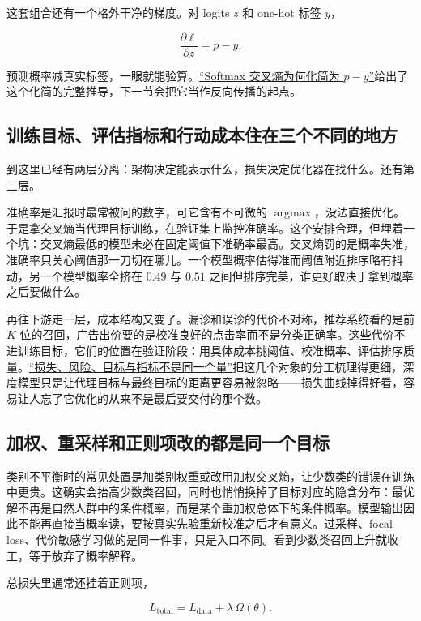 这套组合还有一个格外干净的梯度。对 logits \(z\) 和 one-hot 标签 \(y\)，

\[
\frac{\partial\ell}{\partial z}=p-y .
\]

预测概率减真实标签，一眼就能验算。\hyperref[sec:10-Matrix-Calculus/04-Applications/02]{``Softmax 交叉熵为何化简为 \(p-y\)''}给出了这个化简的完整推导，下一节会把它当作反向传播的起点。

\subsection{训练目标、评估指标和行动成本住在三个不同的地方}

到这里已经有两层分离：架构决定能表示什么，损失决定优化器在找什么。还有第三层。

准确率是汇报时最常被问的数字，可它含有不可微的 \(\operatorname{argmax}\)，没法直接优化。于是拿交叉熵当代理目标训练，在验证集上监控准确率。这个安排合理，但埋着一个坑：交叉熵最低的模型未必在固定阈值下准确率最高。交叉熵罚的是概率失准，准确率只关心阈值那一刀切在哪儿。一个模型概率估得准而阈值附近排序略有抖动，另一个模型概率全挤在 \(0.49\) 与 \(0.51\) 之间但排序完美，谁更好取决于拿到概率之后要做什么。

再往下游走一层，成本结构又变了。漏诊和误诊的代价不对称，推荐系统看的是前 \(K\) 位的召回，广告出价要的是校准良好的点击率而不是分类正确率。这些代价不进训练目标，它们的位置在验证阶段：用具体成本挑阈值、校准概率、评估排序质量。\hyperref[sec:13-Machine-Learning/01-Learning-Problems-and-Evaluation/02]{``损失、风险、目标与指标不是同一个量''}把这几个对象的分工梳理得更细，深度模型只是让代理目标与最终目标的距离更容易被忽略——损失曲线掉得好看，容易让人忘了它优化的从来不是最后要交付的那个数。

\subsection{加权、重采样和正则项改的都是同一个目标}

类别不平衡时的常见处置是加类别权重或改用加权交叉熵，让少数类的错误在训练中更贵。这确实会抬高少数类召回，同时也悄悄换掉了目标对应的隐含分布：最优解不再是自然人群中的条件概率，而是某个重加权总体下的条件概率。模型输出因此不能再直接当概率读，要按真实先验重新校准之后才有意义。过采样、focal loss、代价敏感学习做的是同一件事，只是入口不同。看到少数类召回上升就收工，等于放弃了概率解释。

总损失里通常还挂着正则项，

\[
L_{\mathrm{total}}=L_{\mathrm{data}}+\lambda\,\Omega(\theta).
\]

